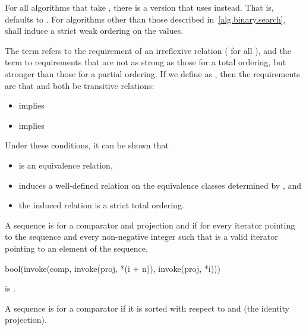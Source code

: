 \pnum
For all algorithms that take ,
there is a version that uses  instead.
That is,  defaults to .
For algorithms other than those described in~\ref{alg.binary.search},
 shall induce a strict weak ordering on the values.

\pnum
The term  refers to the requirement
of an irreflexive relation ( for all ),
and the term  to requirements
that are not as strong as those for a total ordering,
but stronger than those for a partial ordering.
If we define  as ,
then the requirements are that  and 
both be transitive relations:

\begin{itemize}
\item {} implies 
\item {} implies 
\end{itemize}
\begin{note}
Under these conditions, it can be shown that
\begin{itemize}
\item
   is an equivalence relation,
\item
   induces a well-defined relation
  on the equivalence classes determined by , and
\item
  the induced relation is a strict total ordering.
\end{itemize}
\end{note}

\pnum
{}%
A sequence is 
for a comparator and projection  and 
if for every iterator  pointing to the sequence and
every non-negative integer 
such that  is a valid iterator
pointing to an element of the sequence,
\begin{codeblock}
bool(invoke(comp, invoke(proj, *(i + n)), invoke(proj, *i)))
\end{codeblock}
is .

\pnum
{}%
A sequence is 
for a comparator 
if it is sorted with respect to
 and  (the identity projection).

